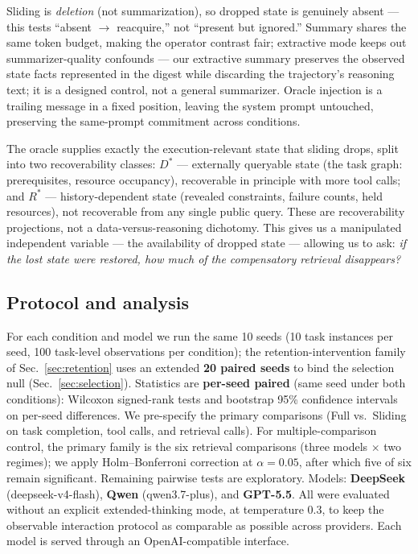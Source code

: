 \documentclass[11pt]{article}
\begin{document}
Sliding is \emph{deletion} (not summarization), so dropped state is genuinely absent --- this
tests ``absent $\to$ reacquire,'' not ``present but ignored.'' Summary shares the same token
budget, making the operator contrast fair; extractive mode keeps out summarizer-quality
confounds --- our extractive summary preserves the observed state facts represented in the
digest while discarding the trajectory's reasoning text; it is a designed control, not a
general summarizer. Oracle injection is a trailing message in a fixed position, leaving
the system prompt untouched, preserving the same-prompt commitment across conditions.

The oracle supplies exactly the execution-relevant state that sliding drops, split into
two recoverability classes: \textbf{$D^*$} --- externally queryable state (the task graph:
prerequisites, resource occupancy), recoverable in principle with more tool calls; and
\textbf{$R^*$} --- history-dependent state (revealed constraints, failure counts, held resources),
not recoverable from any single public query. These are recoverability projections, not a
data-versus-reasoning dichotomy. This gives us a manipulated independent variable --- the
availability of dropped state --- allowing us to ask: \emph{if the lost state were restored, how
much of the compensatory retrieval disappears?}

\subsection{Protocol and analysis}
\label{sec:setup}

For each condition and model we run the same 10 seeds (10 task instances per seed, 100
task-level observations per condition); the retention-intervention family of
Sec.~\ref{sec:retention} uses an extended \textbf{20 paired seeds} to bind the selection null
(Sec.~\ref{sec:selection}). Statistics are \textbf{per-seed paired} (same seed
under both conditions): Wilcoxon signed-rank tests and bootstrap 95\% confidence intervals
on per-seed differences. We pre-specify the primary
comparisons (Full vs.\ Sliding on task completion, tool calls, and retrieval calls). For
multiple-comparison control, the primary family is the six retrieval comparisons (three
models $\times$ two regimes); we apply Holm--Bonferroni correction at $\alpha = 0.05$, after which five
of six remain significant. Remaining pairwise tests are exploratory. Models: \textbf{DeepSeek}
(deepseek-v4-flash), \textbf{Qwen} (qwen3.7-plus), and \textbf{GPT-5.5}. All were evaluated without an
explicit extended-thinking mode, at temperature 0.3, to keep the observable interaction
protocol as comparable as possible across providers. Each model is served through an
OpenAI-compatible interface.
\end{document}
